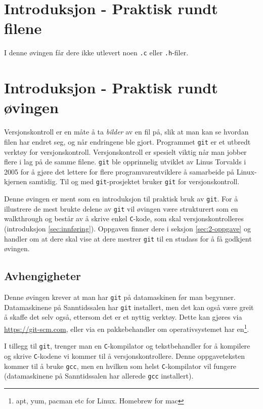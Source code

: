 \begin{alphasection}
\section{Introduksjon - Praktisk rundt filene}

I denne øvingen får dere ikke utlevert noen \verb|.c| eller \verb|.h|-filer.


\section{Introduksjon - Praktisk rundt øvingen}
Versjonskontroll er en måte å ta \textit{bilder} av en fil på, slik at man kan se hvordan filen har endret seg, og når endringene ble gjort. Programmet \verb|git| er et utbredt verktøy for versjonskontroll. Versjonskontroll er spesielt viktig når man jobber flere i lag på de samme filene. \verb|git| ble opprinnelig utviklet av Linus Torvalds i 2005 for å gjøre det lettere for flere programvareutviklere å samarbeide på Linux-kjernen samtidig. Til og med \verb|git|-prosjektet bruker \verb|git| for versjonskontroll. 

 Denne øvingen er ment som en introduksjon til praktisk bruk av \verb|git|. For å illustrere de mest brukte delene av \verb|git| vil øvingen være strukturert som en walkthrough og består av å skrive enkel \verb|C|-kode, som skal versjonskontrolleres (introduksjon \ref{sec:innføring}). Oppgaven finner dere i seksjon \ref{sec:2-oppgave} og handler om at dere skal vise at dere mestrer \verb|git| til en studass for å få godkjent øvingen.

\subsection{Avhengigheter}

Denne øvingen krever at man har \verb|git| på datamaskinen før man begynner. Datamaskinene på Sanntidssalen har \verb|git| installert, men det kan også være greit å skaffe det selv også, ettersom det er et nyttig verktøy. Dette kan gjøres via \href{https://git-scm.com/downloads}{https://git-scm.com}, eller via en pakkebehandler om operativsystemet har en\footnote{apt, yum, pacman etc for Linux. Homebrew for mac}.

I tillegg til \verb|git|, trenger man en \verb|C|-kompilator og tekstbehandler for å kompilere og skrive \verb|C|-kodene vi kommer til å versjonskontrollere. Denne oppgaveteksten kommer til å bruke \verb|gcc|, men en hvilken som helst \verb|C|-kompilator vil fungere (datamaskinene på Sanntidssalen har allerede \verb|gcc| installert).



\end{alphasection}
